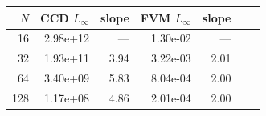 \begin{tabular}{rrrrrrr}
\toprule
$N$ & CCD $L_\infty$ & slope & FVM $L_\infty$ & slope \\
\midrule
16 & 2.98e+12 & --- & 1.30e-02 & --- \\
32 & 1.93e+11 & 3.94 & 3.22e-03 & 2.01 \\
64 & 3.40e+09 & 5.83 & 8.04e-04 & 2.00 \\
128 & 1.17e+08 & 4.86 & 2.01e-04 & 2.00 \\
\bottomrule
\end{tabular}
